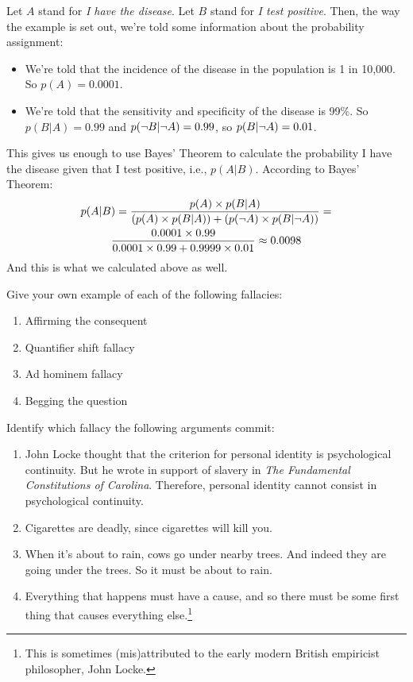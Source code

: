 Let $A$ stand for \emph{I have the disease}. Let $B$ stand for \emph{I test positive}. Then, the way the example is set out, we're told some information about the probability assignment:
\begin{itemize}
\item We're told that the incidence of the disease in the population is 1 in 10,000. So $p(A) = 0.0001$.
\item We're told that the sensitivity and specificity of the disease is 99\%. So $p(B | A) = 0.99$ and $p(\neg B | \neg A) = 0.99$, so $p(B | \neg A) = 0.01$.
\end{itemize}
This gives us enough to use Bayes' Theorem to calculate the probability I have the disease given that I test positive, i.e., $p(A | B)$. According to Bayes' Theorem:
\begin{multline*}
p(A | B) = \frac{p(A) \times p(B|A)}{(p(A) \times p(B|A)) + (p(\neg A)\times p(B|\neg A))} = \\ \frac{0.0001 \times 0.99}{0.0001 \times 0.99 + 0.9999 \times 0.01} \approx 0.0098
\end{multline*}
And this is what we calculated above as well.

\practiceproblems

\problempart Give your own example of each of the following fallacies:
\begin{enumerate}
\item Affirming the consequent
\item Quantifier shift fallacy
\item Ad hominem fallacy
\item Begging the question
\end{enumerate}

\problempart Identify which fallacy the following arguments commit:
\begin{enumerate}
\item John Locke thought that the criterion for personal identity is psychological continuity. But he wrote in support of slavery in \emph{The Fundamental Constitutions of Carolina}. Therefore, personal identity cannot consist in psychological continuity.
\item Cigarettes are deadly, since cigarettes will kill you. 
\item When it's about to rain, cows go under nearby trees. And indeed they are going under the trees. So it must be about to rain.
\item Everything that happens must have a cause, and so there must be some first thing that causes everything else.\footnote{This is sometimes (mis)attributed to the early modern British empiricist philosopher, John Locke.}
\end{enumerate}

